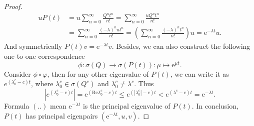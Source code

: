 \documentclass[12pt]{article}
\renewcommand{\(}{\left(}%
\renewcommand{\)}{\right)}%
\renewcommand{\[}{\left[}%
\renewcommand{\]}{\right]}%
\newtheorem{proof}{Proof.}}
\begin{document}
\begin{proof}
     \begin{equation*}
      \begin{split}
       uP(t)&=u\sum_{n=0}^\infty\frac{Q^{n}t^n}{n!}=\sum_{n=0}^\infty\frac{uQ^{n}t^n}{n!}\\
       &=\sum_{n=0}^\infty\frac{(-\lambda)^n ut^n}{n!}=\(\sum_{n=0}^\infty\frac{(-\lambda)^n  t^n}{n!}\)u=\mathrm{e}^{-\lambda t}u.
      \end{split}
     \end{equation*}
     And symmetrically $P(t)v=\mathrm{e}^{-\lambda t}v$.
     Besides, we can also construct the following one-to-one correspondence
    \begin{equation*}
     \phi: \sigma\(Q\)\to\sigma\(P(t)\): \mu\mapsto\mathrm{e}^{\mu t }.
    \end{equation*}
    Consider $\phi\circ \varphi$, then for any other eigenvalue of $P(t)$, we can write it as  $e^{(\lambda_0^c-c) t}$, where $\lambda_0^c\in\sigma(Q^c)$ and $\lambda_0^c\neq \lambda^c$. Thus
     \begin{equation*}
      |e^{(\lambda_0^c-c) t}|=\mathrm{e}^{(\text{Re}\lambda_0^c-c) t}\leq e^{(|\lambda_0^c|-c) t} <e^{(\lambda^c-c) t}=\mathrm{e}^{-\lambda t}.\tag{..}
     \end{equation*}
     Formula $(..)$ mean $\mathrm{e}^{-\lambda t}$ is the principal eigenvalue of $P(t)$. In conclusion, $P(t)$ has principal eigenpairs $(\mathrm{e}^{-\lambda t},u,v)$.


\end{proof}
\end{document}
